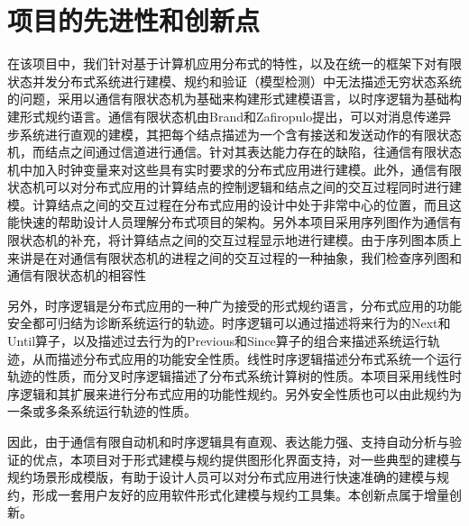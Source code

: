 \chapter{项目的先进性和创新点}
\par
在该项目中，我们针对基于计算机应用分布式的特性，以及在统一的框架下对有限状态并发分布式系统进行建模、规约和验证（模型检测）中无法描述无穷状态系统的问题，采用以通信有限状态机为基础来构建形式建模语言，以时序逻辑为基础构建形式规约语言。通信有限状态机由Brand和Zafiropulo提出，可以对消息传递异步系统进行直观的建模，其把每个结点描述为一个含有接送和发送动作的有限状态机，而结点之间通过信道进行通信。针对其表达能力存在的缺陷，往通信有限状态机中加入时钟变量来对这些具有实时要求的分布式应用进行建模。此外，通信有限状态机可以对分布式应用的计算结点的控制逻辑和结点之间的交互过程同时进行建模。计算结点之间的交互过程在分布式应用的设计中处于非常中心的位置，而且这能快速的帮助设计人员理解分布式项目的架构。另外本项目采用序列图作为通信有限状态机的补充，将计算结点之间的交互过程显示地进行建模。由于序列图本质上来讲是在对通信有限状态机的进程之间的交互过程的一种抽象，我们检查序列图和通信有限状态机的相容性
\par
另外，时序逻辑是分布式应用的一种广为接受的形式规约语言，分布式应用的功能安全都可归结为诊断系统运行的轨迹。时序逻辑可以通过描述将来行为的Next和Until算子，以及描述过去行为的Previous和Since算子的组合来描述系统运行轨迹，从而描述分布式应用的功能安全性质。线性时序逻辑描述分布式系统一个运行轨迹的性质，而分叉时序逻辑描述了分布式系统计算树的性质。本项目采用线性时序逻辑和其扩展来进行分布式应用的功能性规约。另外安全性质也可以由此规约为一条或多条系统运行轨迹的性质。
\par
因此，由于通信有限自动机和时序逻辑具有直观、表达能力强、支持自动分析与验证的优点，本项目对于形式建模与规约提供图形化界面支持，对一些典型的建模与规约场景形成模版，有助于设计人员可以对分布式应用进行快速准确的建模与规约，形成一套用户友好的应用软件形式化建模与规约工具集。本创新点属于增量创新。